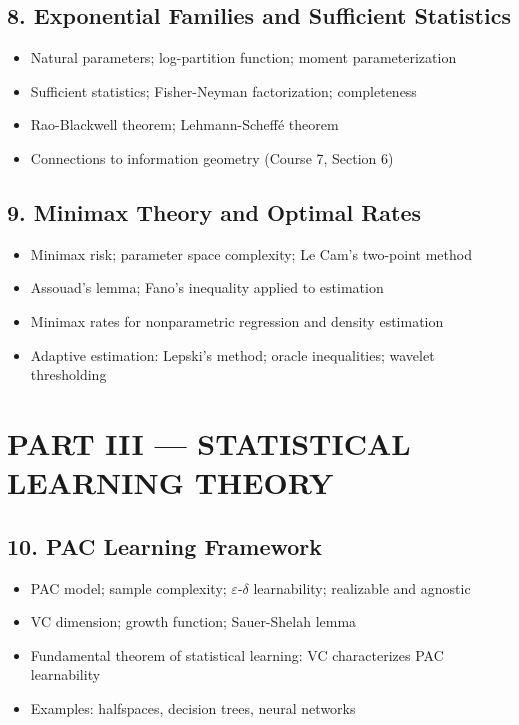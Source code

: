 \subsection{8. Exponential Families and Sufficient Statistics}
\begin{itemize}
\item Natural parameters; log-partition function; moment parameterization
\item Sufficient statistics; Fisher-Neyman factorization; completeness
\item Rao-Blackwell theorem; Lehmann-Scheff\'e theorem
\item Connections to information geometry (Course 7, Section 6)
\end{itemize}

\subsection{9. Minimax Theory and Optimal Rates}
\begin{itemize}
\item Minimax risk; parameter space complexity; Le Cam's two-point method
\item Assouad's lemma; Fano's inequality applied to estimation
\item Minimax rates for nonparametric regression and density estimation
\item Adaptive estimation: Lepski's method; oracle inequalities; wavelet thresholding
\end{itemize}

\section{PART III --- STATISTICAL LEARNING THEORY}

\subsection{10. PAC Learning Framework}
\begin{itemize}
\item PAC model; sample complexity; $\varepsilon$-$\delta$ learnability; realizable and agnostic
\item VC dimension; growth function; Sauer-Shelah lemma
\item Fundamental theorem of statistical learning: VC characterizes PAC learnability
\item Examples: halfspaces, decision trees, neural networks
\end{itemize}

